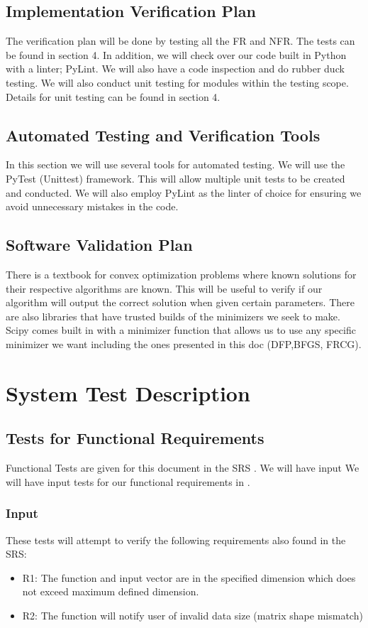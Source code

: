 \documentclass[12pt, titlepage]{article}
\begin{document}
\subsection{Implementation Verification Plan}

The verification plan will be done by testing all the FR and
NFR. The tests can be found in section 4. In addition, we will check over our code built
in Python with a linter; PyLint. We will also have a code inspection and do rubber duck
testing. We will also conduct unit testing for modules 
within the testing scope. Details for unit testing can be found in section 4.


\subsection{Automated Testing and Verification Tools}
In this section we will use several tools for automated testing. We will use the PyTest
 (Unittest) framework. This will allow multiple unit tests to be created and conducted.
 We will also employ PyLint as the linter of choice for ensuring we avoid unnecessary
 mistakes in the code. 


\subsection{Software Validation Plan}
There is a textbook for convex optimization problems \citep{Boyd2006} where known
solutions for their respective algorithms are known. This will be useful to verify 
if our algorithm will output the correct solution when given certain parameters.
There are also libraries that have trusted builds of the minimizers we seek to make. 
Scipy comes built in with a minimizer function that allows us to use any specific
minimizer we want including the ones presented in this doc (DFP,BFGS, FRCG).


\section{System Test Description}

\subsection{Tests for Functional Requirements}
Functional Tests are given for this document in the SRS \citep{SRS}. We will have input 
We will have input tests for our functional requirements in \citep{SRS}.

\subsubsection{Input}
These tests will attempt to verify the following requirements also found in the SRS:
\begin{itemize}
  \item R1: The function and input vector are in the specified dimension which does not exceed
  maximum defined dimension.
  \item R2: The function will notify user of invalid data size (matrix shape mismatch)
\end{itemize}
\end{document}
